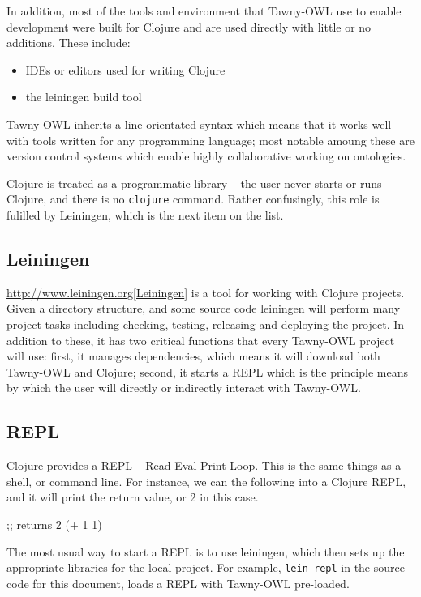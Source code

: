 In addition, most of the tools and environment that Tawny-OWL use to
enable development were built for Clojure and are used directly with
little or no additions. These include:

\begin{itemize}
\item IDEs or editors used for writing Clojure
\item the leiningen build tool
\end{itemize}

Tawny-OWL inherits a line-orientated syntax which means that it works
well with tools written for any programming language; most notable
amoung these are version control systems which enable highly
collaborative working on ontologies.

Clojure is treated as a programmatic library -- the user never starts or
runs Clojure, and there is no \texttt{clojure} command. Rather confusingly,
this role is fulilled by Leiningen, which is the next item on the list.

\subsection{Leiningen}
\label{sec-3-3}

\url{http://www.leiningen.org[Leiningen}] is a tool for working with Clojure
projects. Given a directory structure, and some source code leiningen
will perform many project tasks including checking, testing, releasing
and deploying the project. In addition to these, it has two critical
functions that every Tawny-OWL project will use: first, it manages
dependencies, which means it will download both Tawny-OWL and Clojure;
second, it starts a REPL which is the principle means by which the user
will directly or indirectly interact with Tawny-OWL.

\subsection{REPL}
\label{sec-3-4}

Clojure provides a REPL -- Read-Eval-Print-Loop. This is the same things
as a shell, or command line. For instance, we can the following into a
Clojure REPL, and it will print the return value, or 2 in this case.


\begin{tawny}
;; returns 2 
(+ 1 1)
\end{tawny}

The most usual way to start a REPL is to use leiningen, which then sets
up the appropriate libraries for the local project. For example,
\texttt{lein repl} in the source code for this document, loads a REPL with
Tawny-OWL pre-loaded.

